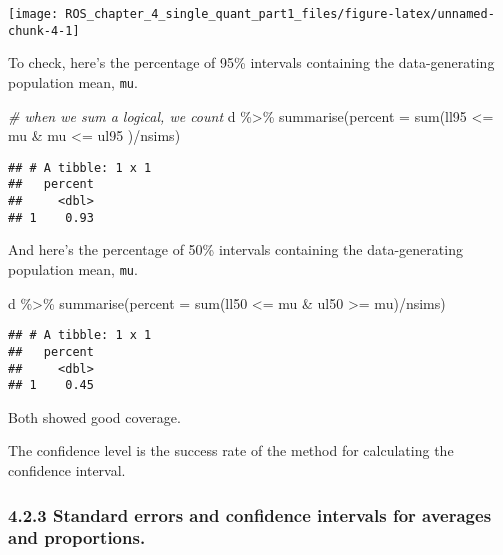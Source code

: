 \documentclass[
]{article}
\newenvironment{Shaded}{\begin{snugshade}}{\end{snugshade}}
\newcommand{\AttributeTok}[1]{\textcolor[rgb]{0.77,0.63,0.00}{#1}}
\newcommand{\CommentTok}[1]{\textcolor[rgb]{0.56,0.35,0.01}{\textit{#1}}}
\newcommand{\FunctionTok}[1]{\textcolor[rgb]{0.00,0.00,0.00}{#1}}
\newcommand{\NormalTok}[1]{#1}
\newcommand{\SpecialCharTok}[1]{\textcolor[rgb]{0.00,0.00,0.00}{#1}}
\begin{document}
\begin{center}\texttt{[image: ROS\_chapter\_4\_single\_quant\_part1\_files/figure-latex/unnamed-chunk-4-1]} \end{center}

To check, here's the percentage of 95\% intervals containing the
data-generating population mean, \texttt{mu}.

\begin{Shaded}
\begin{Highlighting}[]
\CommentTok{\# when we sum a logical, we count}
\NormalTok{d }\SpecialCharTok{\%\textgreater{}\%} 
  \FunctionTok{summarise}\NormalTok{(}\AttributeTok{percent =} \FunctionTok{sum}\NormalTok{(ll95 }\SpecialCharTok{\textless{}=}\NormalTok{ mu }\SpecialCharTok{\&}\NormalTok{ mu }\SpecialCharTok{\textless{}=}\NormalTok{ ul95 )}\SpecialCharTok{/}\NormalTok{nsims)}
\end{Highlighting}
\end{Shaded}

\begin{verbatim}
## # A tibble: 1 x 1
##   percent
##     <dbl>
## 1    0.93
\end{verbatim}

And here's the percentage of 50\% intervals containing the
data-generating population mean, \texttt{mu}.

\begin{Shaded}
\begin{Highlighting}[]
\NormalTok{d }\SpecialCharTok{\%\textgreater{}\%} 
  \FunctionTok{summarise}\NormalTok{(}\AttributeTok{percent =} \FunctionTok{sum}\NormalTok{(ll50 }\SpecialCharTok{\textless{}=}\NormalTok{ mu }\SpecialCharTok{\&}\NormalTok{ ul50 }\SpecialCharTok{\textgreater{}=}\NormalTok{ mu)}\SpecialCharTok{/}\NormalTok{nsims)}
\end{Highlighting}
\end{Shaded}

\begin{verbatim}
## # A tibble: 1 x 1
##   percent
##     <dbl>
## 1    0.45
\end{verbatim}

Both showed good coverage.

The confidence level is the success rate of the method for calculating
the confidence interval.

\hypertarget{standard-errors-and-confidence-intervals-for-averages-and-proportions.}{%
\subsubsection{4.2.3 Standard errors and confidence intervals for
averages and
proportions.}\label{standard-errors-and-confidence-intervals-for-averages-and-proportions.}}
\end{document}
